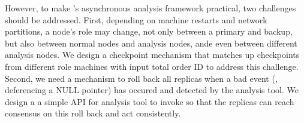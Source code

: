 However, to make \xxx's asynchronous analysis framework practical, two 
challenges should be addressed. First, depending on machine restarts and 
network partitions, a node's role may change, not only between a \paxos primary 
and backup, but also between normal nodes and analysis nodes, ande even between 
different analysis nodes. We design a checkpoint mechanism that matches up 
checkpoints from different role machines with input total order ID to address 
this challenge. Second, we need a mechanism to roll back all replicas when a 
bad event (\eg, deferencing a NULL pointer) has occured and detected by the 
analysis tool. We design a a simple API for analysis tool to invoke so that the 
replicas can reach consensus on this roll back and act consistently.






% 

